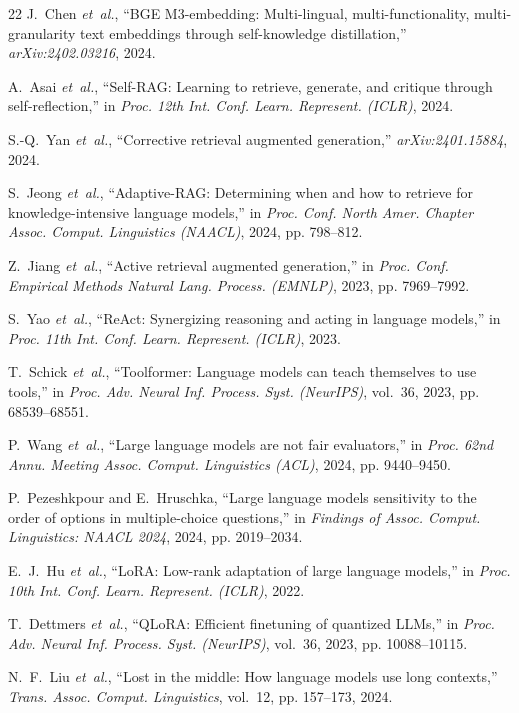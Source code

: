 \documentclass[conference]{IEEEtran}
\begin{document}
\begin{thebibliography}{22}
J.~Chen \textit{et~al.}, ``BGE M3-embedding: Multi-lingual, multi-functionality, multi-granularity text embeddings through self-knowledge distillation,'' \textit{arXiv:2402.03216}, 2024.

A.~Asai \textit{et~al.}, ``Self-RAG: Learning to retrieve, generate, and critique through self-reflection,'' in \textit{Proc. 12th Int. Conf. Learn. Represent. (ICLR)}, 2024.

S.-Q.~Yan \textit{et~al.}, ``Corrective retrieval augmented generation,'' \textit{arXiv:2401.15884}, 2024.

S.~Jeong \textit{et~al.}, ``Adaptive-RAG: Determining when and how to retrieve for knowledge-intensive language models,'' in \textit{Proc. Conf. North Amer. Chapter Assoc. Comput. Linguistics (NAACL)}, 2024, pp. 798--812.

Z.~Jiang \textit{et~al.}, ``Active retrieval augmented generation,'' in \textit{Proc. Conf. Empirical Methods Natural Lang. Process. (EMNLP)}, 2023, pp. 7969--7992.

S.~Yao \textit{et~al.}, ``ReAct: Synergizing reasoning and acting in language models,'' in \textit{Proc. 11th Int. Conf. Learn. Represent. (ICLR)}, 2023.

T.~Schick \textit{et~al.}, ``Toolformer: Language models can teach themselves to use tools,'' in \textit{Proc. Adv. Neural Inf. Process. Syst. (NeurIPS)}, vol.~36, 2023, pp. 68539--68551.

P.~Wang \textit{et~al.}, ``Large language models are not fair evaluators,'' in \textit{Proc. 62nd Annu. Meeting Assoc. Comput. Linguistics (ACL)}, 2024, pp. 9440--9450.

P.~Pezeshkpour and E.~Hruschka, ``Large language models sensitivity to the order of options in multiple-choice questions,'' in \textit{Findings of Assoc. Comput. Linguistics: NAACL 2024}, 2024, pp. 2019--2034.

E.~J.~Hu \textit{et~al.}, ``LoRA: Low-rank adaptation of large language models,'' in \textit{Proc. 10th Int. Conf. Learn. Represent. (ICLR)}, 2022.

T.~Dettmers \textit{et~al.}, ``QLoRA: Efficient finetuning of quantized LLMs,'' in \textit{Proc. Adv. Neural Inf. Process. Syst. (NeurIPS)}, vol.~36, 2023, pp. 10088--10115.

N.~F.~Liu \textit{et~al.}, ``Lost in the middle: How language models use long contexts,'' \textit{Trans. Assoc. Comput. Linguistics}, vol.~12, pp. 157--173, 2024.

\end{thebibliography}
\end{document}
